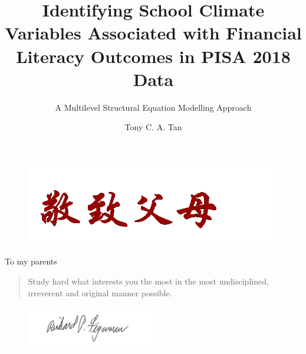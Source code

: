 \documentclass[a4paper,11pt,UKenglish,twoside,openright]{report}\usepackage[]{graphicx}\usepackage[]{color}
\title{Identifying School Climate Variables Associated with Financial Literacy Outcomes in PISA 2018 Data}
\subtitle{A Multilevel Structural Equation Modelling Approach}
\author{Tony C. A. Tan}
\begin{document}
\duoforside[
    fac={Faculty of Educational Sciences},
    dept={Centre for Educational Measurement},
    program={Science (Assessment, Measurement and Evaluation)},
    date={Spring 2021},
    short
]


\thispagestyle{empty}

\vspace*{\fill}
\begin{figure}[h]
    \includegraphics[width=\textwidth]{./Figures/To-parents.png}
\end{figure}
\begin{flushright}
To my parents
\end{flushright}
\vspace*{\fill}
\clearpage
\thispagestyle{empty}

\vspace*{3cm}

\begin{quote}
    \calligra\huge      %
\hyphenchar{}     %
Study hard what interests you the most in the most undisciplined, irreverent and original manner possible.
\end{quote}

\begin{figure}[h]
    \flushright
    \includegraphics[width=0.50\textwidth]{./Figures/Feynman-Signature.jpg}
\end{figure}
\vspace*{-1cm}
\end{document}
